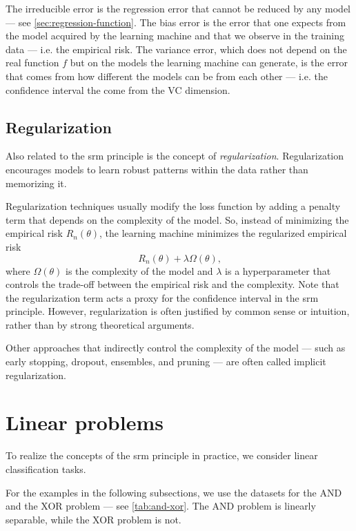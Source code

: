 The irreducible error is the regression error that cannot be reduced by any model --- see
\cref{sec:regression-function}.  The bias error is the error that one expects from the
model acquired by the learning machine and that we observe in the training data --- i.e.
the empirical risk.  The variance error, which does not depend on the real function $f$
but on the models the learning machine can generate, is the error that comes from how
different the models can be from each other --- i.e. the confidence interval the come from
the VC dimension.

\subsection{Regularization}

Also related to the \gls{srm} principle is the concept of \emph{regularization}.
Regularization encourages models to learn robust patterns within the data rather than
memorizing it.

Regularization techniques usually modify the loss function by adding a penalty term that
depends on the complexity of the model.  So, instead of minimizing the empirical risk
$R_n(\theta)$, the learning machine minimizes the regularized empirical risk
\[
  R_n(\theta) + \lambda \Omega(\theta)\text{,}
\]
where $\Omega(\theta)$ is the complexity of the model and $\lambda$ is a hyperparameter
that controls the trade-off between the empirical risk and the complexity.
Note that the regularization term acts a proxy for the confidence interval in the
\gls{srm} principle.  However, regularization is often justified by common sense or
intuition, rather than by strong theoretical arguments.

Other approaches that indirectly control the complexity of the model --- such as early
stopping, dropout, ensembles, and pruning --- are often called implicit regularization.

\section{Linear problems}

To realize the concepts of the \gls{srm} principle in practice, we consider linear
classification tasks.

For the examples in the following subsections, we use the datasets for the AND
and the XOR problem --- see \cref{tab:and-xor}.
The AND problem is linearly separable, while the XOR problem is not.

